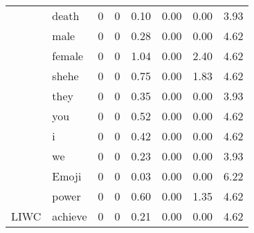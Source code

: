 \begin{table}[!h]
\begin{tabular}[t]{llrrrrrr}
\cmidrule{2-8}
 & death & 0 & 0 & 0.10 & 0.00 & 0.00 & 3.93\\
\cmidrule{2-8}
 & male & 0 & 0 & 0.28 & 0.00 & 0.00 & 4.62\\
\cmidrule{2-8}
 & female & 0 & 0 & 1.04 & 0.00 & 2.40 & 4.62\\
\cmidrule{2-8}
 & shehe & 0 & 0 & 0.75 & 0.00 & 1.83 & 4.62\\
\cmidrule{2-8}
 & they & 0 & 0 & 0.35 & 0.00 & 0.00 & 3.93\\
\cmidrule{2-8}
 & you & 0 & 0 & 0.52 & 0.00 & 0.00 & 4.62\\
\cmidrule{2-8}
 & i & 0 & 0 & 0.42 & 0.00 & 0.00 & 4.62\\
\cmidrule{2-8}
 & we & 0 & 0 & 0.23 & 0.00 & 0.00 & 3.93\\
\cmidrule{2-8}
 & Emoji & 0 & 0 & 0.03 & 0.00 & 0.00 & 6.22\\
\cmidrule{2-8}
 & power & 0 & 0 & 0.60 & 0.00 & 1.35 & 4.62\\
\cmidrule{2-8}
\multirow{-33}{*}{\raggedright\arraybackslash LIWC} & achieve & 0 & 0 & 0.21 & 0.00 & 0.00 & 4.62\\
\bottomrule
\end{tabular}
\end{table}
